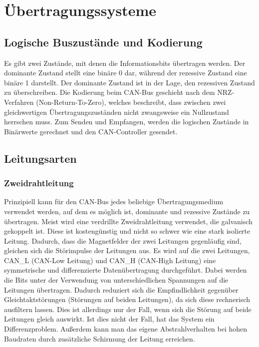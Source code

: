\section{Übertragungssysteme}

    \subsection{Logische Buszustände und Kodierung}
    Es gibt zwei Zustände, mit denen die Informationsbits übertragen werden.
    Der dominante Zustand stellt eine binäre 0 dar, während der rezessive Zustand eine binäre 1 darstellt.
    Der dominante Zustand ist in der Lage, den rezessiven Zustand zu überschreiben.
    Die Kodierung beim CAN-Bus geschieht nach dem NRZ-Verfahren (Non-Return-To-Zero), welches beschreibt, dass zwischen zwei gleichwertigen Übertragungszuständen nicht zwangsweise ein Nullzustand herrschen muss.
    Zum Senden und Empfangen, werden die logischen Zustände in Binärwerte gerechnet und den CAN-Controller gesendet.
    
    \subsection{Leitungsarten}
        \subsubsection{Zweidrahtleitung}
        Prinzipiell kann für den CAN-Bus jedes beliebige Übertragungsmedium verwendet werden, auf dem es möglich ist, dominante und rezessive Zustände zu übertragen.
        Meist wird eine verdrillte Zweidrahtleitung verwendet, die galvanisch gekoppelt ist. Diese ist kostengünstig und nicht so schwer wie eine stark isolierte Leitung.
        Dadurch, dass die Magnetfelder der zwei Leitungen gegenläufig sind, gleichen sich die Störimpulse der Leitungen aus.
        Es wird auf die zwei Leitungen, CAN\_L (CAN-Low Leitung) und CAN\_H (CAN-High Leitung) eine symmetrische und differenzierte Datenübertragung durchgeführt.
        Dabei werden die Bits unter der Verwendung von unterschiedlichen Spannungen auf die Leitungen übertragen.
        Dadurch reduziert sich die Empfindlichkeit gegenüber Gleichtaktstörungen (Störungen auf beiden Leitungen), da sich diese rechnerisch ausfiltern lassen.
        Dies ist allerdings nur der Fall, wenn sich die Störung auf beide Leitungen gleich auswirkt.
        Ist dies nicht der Fall, hat das System ein Differenzproblem.
        Außerdem kann man das eigene Abstrahlverhalten bei hohen Baudraten durch zusätzliche Schirmung der Leitung erreichen.

